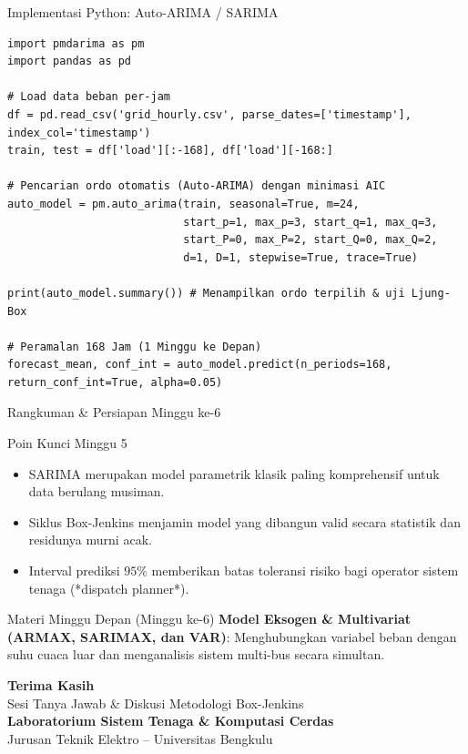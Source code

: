 \documentclass[aspectratio=169, 10pt]{beamer}
\begin{document}
\begin{frame}[fragile]{Implementasi Python: Auto-ARIMA / SARIMA}
\begin{lstlisting}
import pmdarima as pm
import pandas as pd

# Load data beban per-jam
df = pd.read_csv('grid_hourly.csv', parse_dates=['timestamp'], index_col='timestamp')
train, test = df['load'][:-168], df['load'][-168:]

# Pencarian ordo otomatis (Auto-ARIMA) dengan minimasi AIC
auto_model = pm.auto_arima(train, seasonal=True, m=24,
                           start_p=1, max_p=3, start_q=1, max_q=3,
                           start_P=0, max_P=2, start_Q=0, max_Q=2,
                           d=1, D=1, stepwise=True, trace=True)
                           
print(auto_model.summary()) # Menampilkan ordo terpilih & uji Ljung-Box

# Peramalan 168 Jam (1 Minggu ke Depan)
forecast_mean, conf_int = auto_model.predict(n_periods=168, return_conf_int=True, alpha=0.05)
\end{lstlisting}
\end{frame}

\begin{frame}{Rangkuman \& Persiapan Minggu ke-6}
    \begin{block}{Poin Kunci Minggu 5}
        \begin{itemize}
            \item SARIMA merupakan model parametrik klasik paling komprehensif untuk data berulang musiman.
            \item Siklus Box-Jenkins menjamin model yang dibangun valid secara statistik dan residunya murni acak.
            \item Interval prediksi $95\%$ memberikan batas toleransi risiko bagi operator sistem tenaga (*dispatch planner*).
        \end{itemize}
    \end{block}
    \vspace{0.2cm}
    \begin{alertblock}{Materi Minggu Depan (Minggu ke-6)}
        \textbf{Model Eksogen \& Multivariat (ARMAX, SARIMAX, dan VAR)}: Menghubungkan variabel beban dengan suhu cuaca luar dan menganalisis sistem multi-bus secara simultan.
    \end{alertblock}
\end{frame}

\begin{frame}[plain]
    \begin{center}
        \vspace{1.5cm}
        {\Huge \color{mainblue} \textbf{Terima Kasih}}\\[0.4cm]
        {\large Sesi Tanya Jawab \& Diskusi Metodologi Box-Jenkins}\\[1.2cm]
        \textbf{Laboratorium Sistem Tenaga \& Komputasi Cerdas}\\
        Jurusan Teknik Elektro -- Universitas Bengkulu
    \end{center}
\end{frame}
\end{document}
